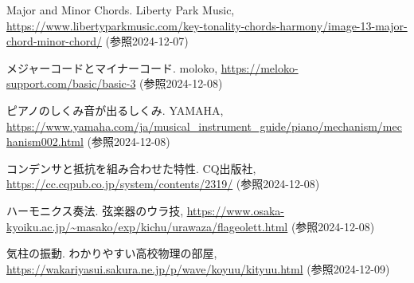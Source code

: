 \documentclass{article}
\begin{document}
\begin{spacing}{1.4}
    \noindent
    [10] Major and Minor Chords. Liberty Park Music, 
    \url{https://www.libertyparkmusic.com/key-tonality-chords-harmony/image-13-major-chord-minor-chord/}
    (参照2024-12-07)

    \noindent
    [11] メジャーコードとマイナーコード. moloko, 
    \url{https://meloko-support.com/basic/basic-3}
    (参照2024-12-08)

    \noindent
    [12] ピアノのしくみ音が出るしくみ. YAMAHA, 
    \url{https://www.yamaha.com/ja/musical_instrument_guide/piano/mechanism/mechanism002.html}
    (参照2024-12-08)

    \noindent
    [13] コンデンサと抵抗を組み合わせた特性. CQ出版社, 
    \url{https://cc.cqpub.co.jp/system/contents/2319/}
    (参照2024-12-08)

    \noindent
    [14] ハーモニクス奏法. 弦楽器のウラ技,
    \url{https://www.osaka-kyoiku.ac.jp/~masako/exp/kichu/urawaza/flageolett.html}
    (参照2024-12-08)

    \noindent
    [15] 気柱の振動. わかりやすい高校物理の部屋,
    \url{https://wakariyasui.sakura.ne.jp/p/wave/koyuu/kityuu.html}
    (参照2024-12-09)
\end{spacing}
\end{document}
